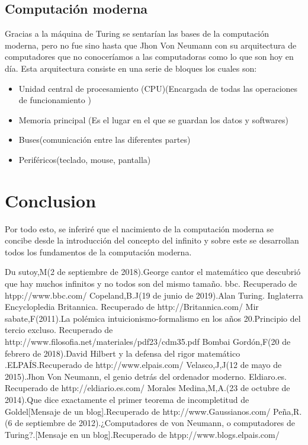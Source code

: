 \documentclass[conference,compsoc]{IEEEtran}
\begin{document}
\subsection{Computación moderna}
     Gracias a la máquina de Turing se sentarían las bases de la computación moderna, pero no fue sino hasta que Jhon Von Neumann con su arquitectura de computadores  que no conoceríamos a las computadoras como lo que son hoy en día. Esta arquitectura consiste en una serie de bloques los cuales son:\\
\begin{itemize}
    \item Unidad central de procesamiento (CPU)(Encargada  de todas las operaciones de funcionamiento )
    \item Memoria principal (Es el lugar en el que se guardan los datos y softwares)
    \item Buses(comunicación entre las diferentes partes)
    \item Periféricos(teclado, mouse, pantalla)
\end{itemize}

\section{Conclusion}
Por todo esto, se inferiré que el nacimiento de la computación moderna se concibe desde la introducción del concepto del infinito y sobre este se desarrollan todos los fundamentos de la computación moderna.
\begin{thebibliography}{12}

   \bibitem{}	Du sutoy,M(2 de septiembre de 2018).George cantor el matemático que descubrió que hay muchos infinitos y no todos son del mismo tamaño. bbc. Recuperado de htpp://www.bbc.com/
        \bibitem{}Copeland,B.J(19 de junio de 2019).Alan Turing. Inglaterra Encyclopledia Britannica. Recuperado de http://Britannica.com/
        \bibitem{}Mir sabate,F(2011).La polémica intuicionismo-formalismo en los años 20.Principio del tercio excluso. Recuperado de http://www.filosofia.net/materiales/pdf23/cdm35.pdf
        \bibitem{}Bombai Gordón,F(20 de febrero de 2018).David Hilbert y la defensa del rigor matemático .ELPAÍS.Recuperado de http://www.elpais.com/
        \bibitem{}Velasco,J,J(12 de mayo de 2015).Jhon Von Neumann, el genio detrás del ordenador moderno. Eldiaro.es. Recuperado de http://eldiario.es.com/ 
        \bibitem{}Morales Medina,M,A.(23 de octubre de 2014).Que dice exactamente el primer teorema de incompletitud de Goldel[Mensaje de un blog].Recuperado de http://www.Gaussianos.com/
        \bibitem{}Peña,R.(6 de septiembre de 2012).¿Computadores de von Neumann, o computadores de Turing?.[Mensaje en un blog].Recuperado de htpp://www.blogs.elpais.com/

\end{thebibliography}




\end{document}
